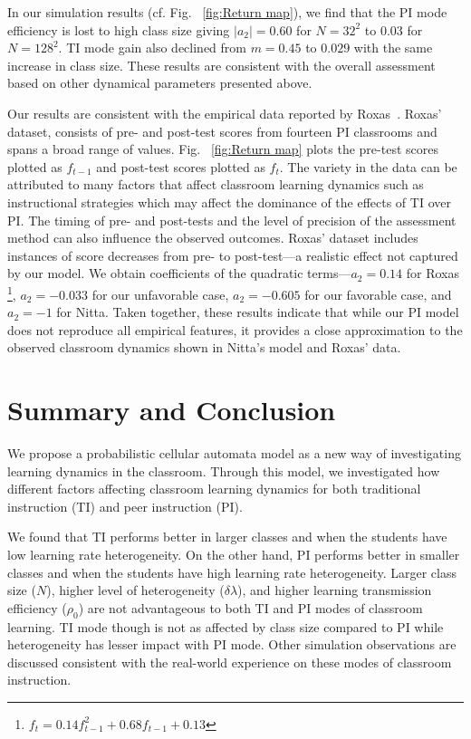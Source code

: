 \documentclass[twocolumn,secnumarabic,amssymb, nobibnotes, aps, prd]{revtex4-2}
\begin{document}
    In our simulation results (cf. Fig. ~\ref{fig:Return map}), we find that the PI mode efficiency is lost to high class size giving $|a_2|=0.60$ for $N=32^2$ to $0.03$ for $N=128^2$.
    TI mode gain also declined from $m=0.45$ to $0.029$ with the same increase in class size.
    These results are consistent with the overall assessment based on other dynamical parameters presented above.

    Our results are consistent with the empirical data reported by Roxas~\cite{roxas2010seating}.
    Roxas' dataset, consists of pre- and post-test scores from fourteen PI classrooms and spans a broad range of values.
    Fig. ~\ref{fig:Return map} plots the pre-test scores plotted as $f_{t-1}$ and post-test scores plotted as $f_{t}$.
    The variety in the data can be attributed to many factors that affect classroom learning dynamics such as instructional strategies which may affect the dominance of the effects of TI over PI.
    The timing of pre- and post-tests and the level of precision of the assessment method can also influence the observed outcomes.
    Roxas' dataset includes instances of score decreases from pre- to post-test---a realistic effect not captured by our model.
    We obtain coefficients of the quadratic terms---$a_2 = 0.14$ for Roxas \footnote{
        $f_t = 0.14 f_{t-1}^2 + 0.68 f_{t-1} + 0.13$
    }, $a_2 = -0.033$ for our unfavorable case, $a_2 = -0.605$ for our favorable case, and $a_2 = -1$ for Nitta.
    Taken together, these results indicate that while our PI model does not reproduce all empirical features, it provides a close approximation to the observed classroom dynamics shown in Nitta's model and Roxas' data.


\section{Summary and Conclusion}
    We propose a probabilistic cellular automata model as a new way of investigating learning dynamics in the classroom.
    Through this model, we investigated how different factors affecting classroom learning dynamics for both traditional instruction (TI) and peer instruction (PI).

    We found that TI performs better in larger classes and when the students have low learning rate heterogeneity.
    On the other hand, PI performs better in smaller classes and when the students have high learning rate heterogeneity.
    Larger class size ($N$), higher level of heterogeneity ($\delta\!\lambda$), and higher learning transmission efficiency ($\rho_0$) are not advantageous to both TI and PI modes of classroom learning.
    TI mode though is not as affected by class size compared to PI while heterogeneity has lesser impact with PI mode.
    Other simulation observations are discussed consistent with the real-world experience on these modes of classroom instruction.
\end{document}
